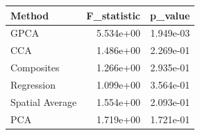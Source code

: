 \begin{tabular}{lrr}
\toprule
Method & F_statistic & p_value \\
\midrule
GPCA & 5.534e+00 & 1.949e-03 \\
CCA & 1.486e+00 & 2.269e-01 \\
Composites & 1.266e+00 & 2.935e-01 \\
Regression & 1.099e+00 & 3.564e-01 \\
Spatial Average & 1.554e+00 & 2.093e-01 \\
PCA & 1.719e+00 & 1.721e-01 \\
\bottomrule
\end{tabular}
